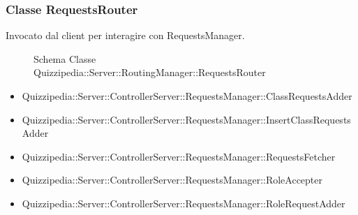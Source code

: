 \subsubsection{Classe RequestsRouter}
Invocato dal client per interagire con RequestsManager.
\begin{figure}[H]
\centering
\noindent{}
\caption[Schema Classe RequestsRouter]{Schema Classe Quizzipedia::Server::RoutingManager::RequestsRouter}
\end{figure}
\begin{itemize}
\item Quizzipedia::Server::ControllerServer::RequestsManager::ClassRequestsAdder
\item Quizzipedia::Server::ControllerServer::RequestsManager::InsertClassRequestsAdder
\item Quizzipedia::Server::ControllerServer::RequestsManager::RequestsFetcher
\item Quizzipedia::Server::ControllerServer::RequestsManager::RoleAccepter
\item Quizzipedia::Server::ControllerServer::RequestsManager::RoleRequestAdder
\end{itemize}

